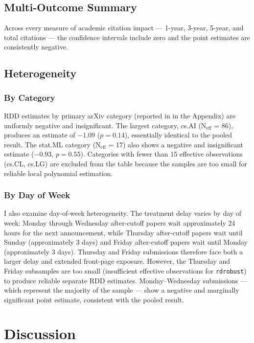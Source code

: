 \documentclass[12pt]{article}
\begin{document}
\subsection{Multi-Outcome Summary}

Across every measure of academic citation impact --- 1-year, 3-year, 5-year, and total citations --- the confidence intervals include zero and the point estimates are consistently negative.

\subsection{Heterogeneity}

\subsubsection{By Category}

RDD estimates by primary arXiv category (reported in  in the Appendix) are uniformly negative and insignificant. The largest category, cs.AI (N$_{\text{eff}}$ = 86), produces an estimate of $-1.09$ ($p = 0.14$), essentially identical to the pooled result. The stat.ML category (N$_{\text{eff}}$ = 17) also shows a negative and insignificant estimate ($-0.93$, $p = 0.55$). Categories with fewer than 15 effective observations (cs.CL, cs.LG) are excluded from the table because the samples are too small for reliable local polynomial estimation.

\subsubsection{By Day of Week}

I also examine day-of-week heterogeneity. The treatment delay varies by day of week: Monday through Wednesday after-cutoff papers wait approximately 24 hours for the next announcement, while Thursday after-cutoff papers wait until Sunday (approximately 3 days) and Friday after-cutoff papers wait until Monday (approximately 3 days). Thursday and Friday submissions therefore face both a larger delay and extended front-page exposure. However, the Thursday and Friday subsamples are too small (insufficient effective observations for \texttt{rdrobust}) to produce reliable separate RDD estimates. Monday--Wednesday submissions --- which represent the majority of the sample --- show a negative and marginally significant point estimate, consistent with the pooled result.


\section{Discussion}
\end{document}
